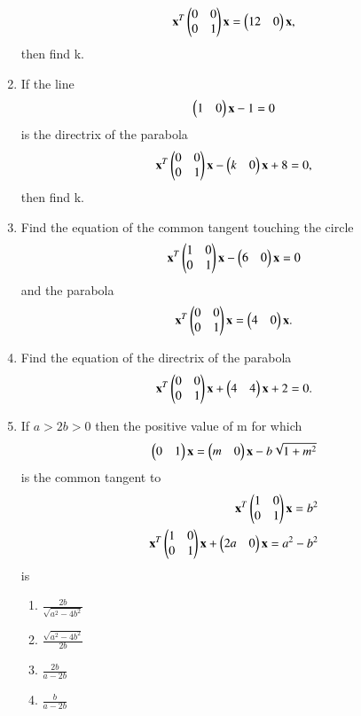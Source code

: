 \documentclass[journal,12pt,twocolumn]{IEEEtran}
\begin{document}
\begin{enumerate}[label=\arabic*]
    \begin{align}
    \mathbf {x}^T\begin{pmatrix}0 & 0 \\0 & 1\end{pmatrix} \mathbf{x}=\begin{pmatrix}12&0\end{pmatrix}\mathbf{x},
    \end{align} then find k.
\item If the line 
    \begin{align}
    \begin{pmatrix}1&0\end{pmatrix}\mathbf{x}-1=0
    \end{align}is the directrix of the parabola 
    \begin{align}
    \mathbf{x}^T \begin{pmatrix}0 & 0 \\0 & 1\end{pmatrix}\mathbf{x}-\begin{pmatrix}k&0\end{pmatrix}\mathbf{x}+8=0,
    \end{align}then find k. 
\item Find the equation of the common tangent touching the circle 
    \begin{align}
    \mathbf {x}^T\begin{pmatrix}1 & 0 \\0 & 1\end{pmatrix}\mathbf{x}-\begin{pmatrix}6&0\end{pmatrix}\mathbf{x} =0
    \end{align} and the parabola 
    \begin{align}\mathbf{x}^T \begin{pmatrix}0 & 0 \\0 & 1\end{pmatrix}\mathbf{x}=\begin{pmatrix}4&0\end{pmatrix}\mathbf{x}.
    \end{align}
\item Find the equation of the directrix of the parabola 
    \begin{align}
    \mathbf{x}^T\begin{pmatrix}0 & 0 \\0 & 1\end{pmatrix}\mathbf{x}+\begin{pmatrix}4&4\end{pmatrix}\mathbf{x}+2=0.
    \end{align}
\item If $a>2b>0$ then the positive value of m for which 
	\begin{align}
    \begin{pmatrix}0&1\end{pmatrix}\mathbf {x}=\begin{pmatrix}m&0\end{pmatrix}\mathbf {x}-b\sqrt{1+m^2}
    \end{align} is the common tangent to 
    \begin{align}
    \mathbf {x}^T\begin{pmatrix}1 & 0 \\0 & 1\end{pmatrix}\mathbf{x}=b^2\\ 
    \mathbf {x}^T\begin{pmatrix}1 & 0 \\0 &1\end{pmatrix}\mathbf{x}+\begin{pmatrix}2a&0\end{pmatrix}\mathbf{x}=a^2-b^2
    \end{align} is 
    \begin{enumerate}
    \item $\frac{2b}{\sqrt{a^2-4b^2}}$
    \item $\frac{\sqrt{a^2-4b^2}}{2b}$
    \item $\frac{2b}{a-2b}$
    \item $\frac{b}{a-2b}$
    \end{enumerate}

\end{enumerate}
\end{document}
